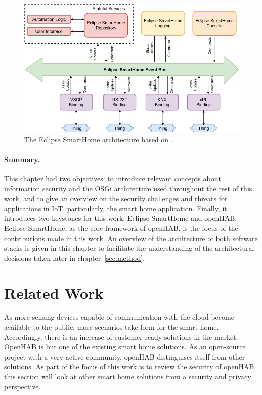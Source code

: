 \documentclass[12pt]{article}
\begin{document}
\begin{figure} [ht] 
\begin{center}
\includegraphics[width=\textwidth]{esh_architecture}
\caption{The Eclipse SmartHome architecture based on~\cite{esh_02}.}
\label{fig:esh_architecture}
\end{center}
\end{figure}

\paragraph{Summary.} This chapter had two objectives: to introduce relevant concepts about information security and the OSGi architecture used throughout the rest of this work, and to give an overview on the security challenges and threats for applications in IoT, particularly, the smart home application. Finally, it introduces two keystones for this work: Eclipse SmartHome and openHAB. Eclipse SmartHome, as the core framework of openHAB, is the focus of the contributions made in this work. An overview of the architecture of both software stacks is given in this chapter to facilitate the understanding of the architectural decisions taken later in chapter~\ref{sec:method}.

\clearpage
\section{Related Work}
\label{sec:related}
As more sensing devices capable of communication with the cloud become available to the public, more scenarios take form for the smart home. Accordingly, there is an increase of customer-ready solutions in the market. OpenHAB is but one of the existing smart home solutions. As an open-source project with a very active community, openHAB distinguises itself from other solutions. As part of the focus of this work is to review the security of openHAB, this section will look at other smart home solutions from a security and privacy perspective. 
\end{document}
